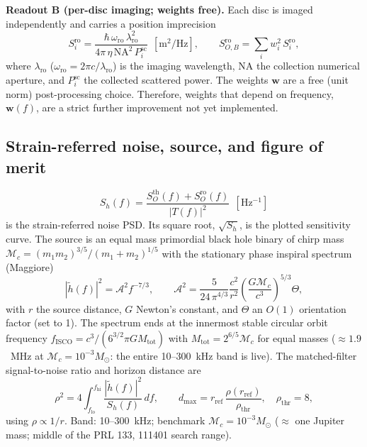 \documentclass[11pt]{article}
\newcommand{\Mc}{\mathcal{M}_c}
\begin{document}
\textbf{Readout B (per-disc imaging; weights free).} Each disc is
imaged independently and carries a position imprecision
\begin{equation}
  S^{\mathrm{ro}}_i =
  \frac{\hbar\,\omega_{\mathrm{ro}}\,\lambda_{\mathrm{ro}}^2}
       {4\pi\,\eta\,\mathrm{NA}^2\, P^{\mathrm{sc}}_i}
  \ \ [\mathrm{m^2/Hz}],
  \qquad
  S^{\mathrm{ro}}_{O,B} = \sum_i w_i^2\, S^{\mathrm{ro}}_i,
  \label{eq:roB}
\end{equation}
where $\lambda_{\mathrm{ro}}$ ($\omega_{\mathrm{ro}} = 2\pi
c/\lambda_{\mathrm{ro}}$) is the imaging wavelength, NA the collection
numerical aperture, and $P^{\mathrm{sc}}_i$ the collected scattered
power. The weights $\mathbf{w}$ are a free (unit norm) post-processing
choice. Therefore, weights that depend on frequency,
$\mathbf{w}(f)$, are a strict further
improvement not yet implemented.

\subsection{Strain-referred noise, source, and figure of merit}

\begin{equation}
  S_h(f) = \frac{S^{\mathrm{th}}_O(f) + S^{\mathrm{ro}}_O(f)}
                {|T(f)|^2} \ \ [\mathrm{Hz^{-1}}]
  \label{eq:Sh}
\end{equation}
is the strain-referred noise PSD. Its square root, $\sqrt{S_h}$, 
is the plotted sensitivity
curve. The source is an equal mass primordial black hole binary of
chirp mass $\Mc = (m_1 m_2)^{3/5}/(m_1+m_2)^{1/5}$ with the
stationary phase inspiral spectrum (Maggiore)
\begin{equation}
  |\tilde h(f)|^2 = \mathcal{A}^2 f^{-7/3}, \qquad
  \mathcal{A}^2 = \frac{5}{24\,\pi^{4/3}} \frac{c^2}{r^2}
  \left(\frac{G\Mc}{c^3}\right)^{\!5/3}\Theta,
  \label{eq:source}
\end{equation}
with $r$ the source distance, $G$ Newton's constant, and $\Theta$ an
$O(1)$ orientation factor (set to 1). The spectrum ends at the
innermost stable circular orbit frequency
$f_{\mathrm{ISCO}} = c^3/(6^{3/2}\pi G M_{\mathrm{tot}})$ with
$M_{\mathrm{tot}} = 2^{6/5}\Mc$ for equal masses ($\approx 1.9$~MHz at
$\Mc = 10^{-3}M_\odot$: the entire 10--300~kHz band is live). The
matched-filter signal-to-noise ratio and horizon distance are
\begin{equation}
  \rho^2 = 4\int_{f_{\mathrm{lo}}}^{f_{\mathrm{hi}}}
  \frac{|\tilde h(f)|^2}{S_h(f)}\,df,
  \qquad
  d_{\max} = r_{\mathrm{ref}}\,\frac{\rho(r_{\mathrm{ref}})}{\rho_{\mathrm{thr}}},
  \quad \rho_{\mathrm{thr}} = 8,
  \label{eq:rho}
\end{equation}
using $\rho \propto 1/r$. Band: 10--300~kHz; benchmark $\Mc =
10^{-3}M_\odot$ ($\approx$ one Jupiter mass; middle of the PRL 133,
111401 search range).
\end{document}
